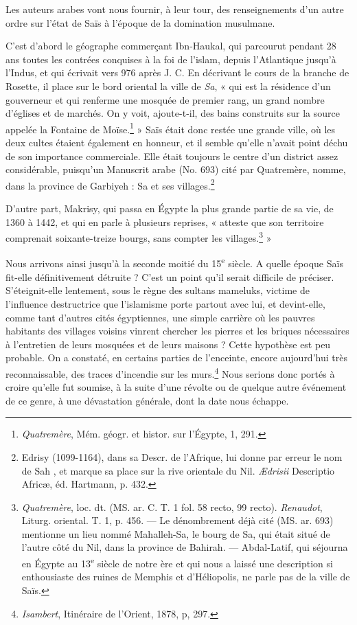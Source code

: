 \documentclass[letterpaper,twocolumn,openany,nodeprecatedcode]{dndbook}
\begin{document}
Les auteurs arabes vont nous fournir, à leur tour, des renseignements d'un autre ordre sur l'état de Saïs à l'époque de la domination musulmane.

C'est d'abord le géographe commerçant Ibn-Haukal, qui parcourut pendant 28 ans toutes les contrées conquises à la foi de l'islam, depuis l'Atlantique jusqu'à l'Indus, et qui écrivait vers 976 après J. C. En décrivant le cours de la branche de Rosette, il place sur le bord oriental la ville de \emph{Sa}, « qui est la résidence d'un gouverneur et qui renferme une mosquée de premier rang, un grand nombre d'églises et de marchés. On y voit, ajoute-t-il, des bains construits sur la source appelée la Fontaine de Moïse.\footnote{\emph{Quatremère}, Mém. géogr. et histor. sur l'Égypte, 1, 291.} » Saïs était donc restée une grande ville, où les deux cultes étaient également en honneur, et il semble qu'elle n'avait point déchu de son importance commerciale. Elle était toujours le centre d'un district assez considérable, puisqu'un Manuscrit arabe (No. 693) cité par Quatremère, nomme, dans la province de Garbiyeh : Sa et ses villages.\footnote{Edrisy (1099-1164), dans sa Descr. de l'Afrique, lui donne par erreur le nom de Sah , et marque sa place sur la rive orientale du Nil. \emph{Ædrisii} Descriptio Africæ, éd. Hartmann, p. 432.}

\vspace*{70mm}

D'autre part, Makrisy, qui passa en Égypte la plus grande partie de sa vie, de 1360 à 1442, et qui en parle à plusieurs reprises, « atteste que son territoire comprenait soixante-treize bourgs, sans compter les villages.\footnote{\emph{Quatremère}, loc. dt. (MS. ar. C. T. 1 fol. 58 recto, 99 recto). \emph{Renaudot}, Liturg. oriental. T. 1, p. 456. --- Le dénombrement déjà cité (MS. ar. 693) mentionne un lieu nommé Mahalleh-Sa, le bourg de Sa, qui était situé de l'autre côté du Nil, dans la province de Bahirah. --- Abdal-Latif, qui séjourna en Égypte au 13\textsuperscript{e} siècle de notre ère et qui nous a laissé une description si enthousiaste des ruines de Memphis et d'Héliopolis, ne parle pas de la ville de Saïs.} »

Nous arrivons ainsi jusqu'à la seconde moitié du 15\textsuperscript{e} siècle. A quelle époque Saïs fit-elle définitivement détruite ? C'est un point qu'il serait difficile de préciser. S'éteignit-elle lentement, sous le règne des sultans mameluks, victime de l'influence destructrice que l'islamisme porte partout avec lui, et devint-elle, comme tant d'autres cités égyptiennes, une simple carrière où les pauvres habitants des villages voisins vinrent chercher les pierres et les briques nécessaires à l'entretien de leurs mosquées et de leurs maisons ? Cette hypothèse est peu probable. On a constaté, en certains parties de l'enceinte, encore aujourd'hui très reconnaissable, des traces d'incendie sur les murs.\footnote{\emph{Isambert}, Itinéraire de l'Orient, 1878, p, 297.} Nous serions donc portés à croire qu'elle fut soumise, à la suite d'une révolte ou de quelque autre événement de ce genre, à une dévastation générale, dont la date nous échappe.
\end{document}
